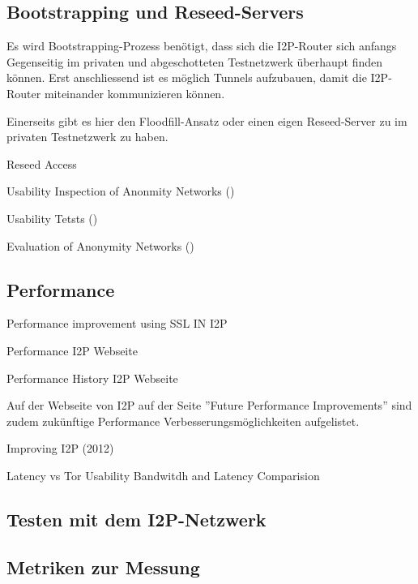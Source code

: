 \subsection{Bootstrapping und Reseed-Servers}

Es wird Bootstrapping-Prozess benötigt, dass sich die I2P-Router sich anfangs Gegenseitig im privaten und abgeschotteten Testnetzwerk überhaupt finden können.
Erst anschliessend ist es möglich Tunnels aufzubauen, damit die I2P-Router miteinander kommunizieren können.


Einerseits gibt es hier den Floodfill-Ansatz oder einen eigen Reseed-Server zu im privaten Testnetzwerk zu haben.

Reseed Access
\cite{noauthor_i2p_nodate-7}

Usability Inspection of Anonmity Networks
(\cite{abou-tair_usability_2009})

Usability Tetsts
(\cite{schomburg_anonymity_2009})

Evaluation of Anonymity Networks
(\cite{timpanaro_evaluation_2015})

\subsection{Performance}


Performance improvement using SSL IN I2P
\cite{vashi_performance_2015}

Performance I2P Webseite
\cite{noauthor_performance_nodate}

Performance History I2P Webseite
\cite{noauthor_performance_nodate-1}

Auf der Webseite von I2P auf der Seite ''Future Performance Improvements'' sind zudem zukünftige Performance Verbesserungsmöglichkeiten aufgelistet.
\cite{noauthor_future_nodate}

Improving I2P (2012)
\cite{timpanaro_improving_2012}

Latency vs Tor Usability Bandwitdh and Latency Comparision
\cite{ehlert_i2p_2021}


\subsection{Testen mit dem I2P-Netzwerk}

\subsection{Metriken zur Messung}

